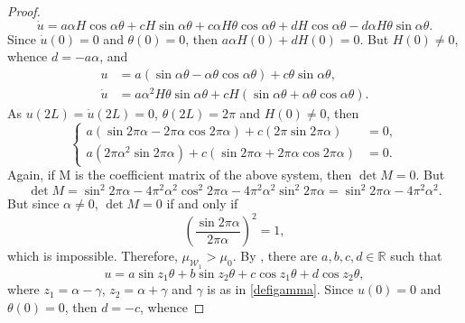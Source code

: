 \documentclass[11pt]{amsart}
\newcommand{\rr}{{\mathbb{R}}}
\theoremstyle{definition}
\theoremstyle{remark}
\numberwithin{equation}{section}
\begin{document}
\begin{proof}
\begin{equation*}
\dot u=a\alpha H\cos\alpha\theta+cH\sin\alpha\theta+c\alpha H\theta\cos\alpha\theta+d H\cos\alpha\theta-d\alpha H\theta\sin\alpha\theta.
\end{equation*}
Since $\dot u(0)=0$ and $\theta(0)=0$, then $a\alpha H(0)+d H(0)=0$. But $H(0)\neq 0$, whence $d=-a\alpha$, and 
\begin{align*}
u&=a\left(\sin \alpha\theta-\alpha\theta\cos\alpha\theta\right)+c\theta \sin \alpha\theta,\\
\dot u&=a\alpha^2H\theta\sin\alpha\theta+cH\left(\sin\alpha\theta+\alpha\theta\cos\alpha\theta\right).
\end{align*}
As $u(2L)=\dot u(2L)=0$, $\theta(2L)=2\pi$ and $H(0)\neq 0$, then 
\begin{equation*}
\begin{cases}
a\left(\sin 2\pi\alpha-2\pi\alpha\cos2\pi\alpha\right)+c\left(2\pi\sin 2\pi\alpha\right)&=0,\\
a\left(2\pi\alpha^2\sin 2\pi\alpha\right)+c\left(\sin2\pi\alpha+2\pi\alpha\cos 2\pi\alpha\right)&=0.
\end{cases}
\end{equation*}
Again, if M is the coefficient matrix of the above system,  then $\det M=0$. But
\begin{equation*}
\det M=\sin^2 2\pi\alpha-4\pi^2\alpha^2\cos^2 2\pi\alpha-4\pi^2\alpha^2\sin^2 2\pi\alpha=\sin^2 2\pi\alpha-4\pi^2\alpha^2.
\end{equation*}
But since $\alpha\neq 0$, $\det M=0$ if and only if 
\begin{equation*}
\left(\frac{\sin 2\pi\alpha}{2\pi\alpha}\right)^2=1,
\end{equation*}
which is impossible.
Therefore, $\mu_{\mathcal W_1}>\mu_0$. 
By , there are $a,b,c,d\in\rr$ such that
\begin{equation*}
u=a\sin z_1\theta+b\sin z_2\theta +c\cos z_1\theta+d\cos z_2\theta,
\end{equation*}
where $z_1=\alpha-\gamma$, $z_2=\alpha+\gamma$ and $\gamma $ is as in \eqref{defigamma}. Since $u(0)=0$ and $\theta(0)=0$, then $d=-c$, whence

\end{proof}
\end{document}
